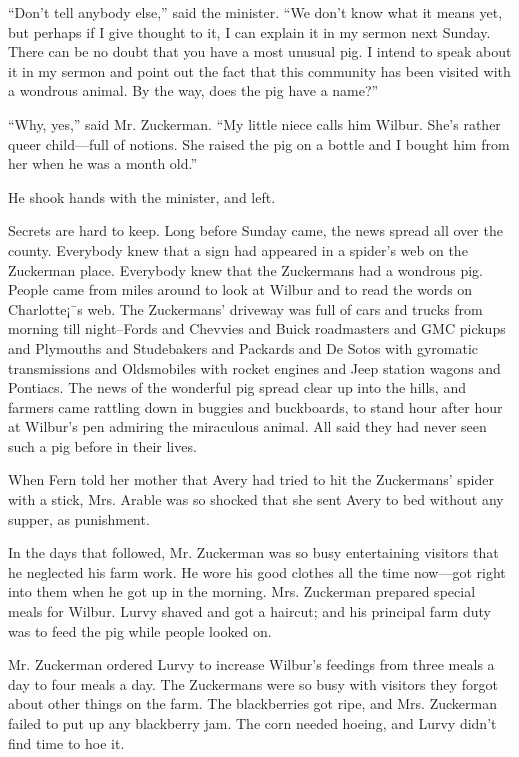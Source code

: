 \documentclass[a4paper, oneside]{book}
\begin{document}
``Don't tell anybody else,'' said the minister. ``We don't know
what it means yet, but perhaps if I give thought to it, I can explain
it in my sermon next Sunday. There can be no doubt that you have
a most unusual pig. I intend to speak about it in my sermon and
point out the fact that this community has been visited with a
wondrous animal. By the way, does the pig have a name?''

``Why, yes,'' said Mr. Zuckerman. ``My little niece calls him
Wilbur. She's rather queer child---full of notions. She raised the pig
on a bottle and I bought him from her when he was a month old.''

He shook hands with the minister, and left.

Secrets are hard to keep. Long before Sunday came, the news
spread all over the county. Everybody knew that a sign had
appeared in a spider's web on the Zuckerman place. Everybody
knew that the Zuckermans had a wondrous pig. People came from
miles around to look at Wilbur and to read the words on
Charlotte¡¯s web. The Zuckermans' driveway was full of cars and
trucks from morning till night--Fords and Chevvies and Buick
roadmasters and GMC pickups and Plymouths and Studebakers
and Packards and De Sotos with gyromatic transmissions and
Oldsmobiles with rocket engines and Jeep station wagons and
Pontiacs. The news of the wonderful pig spread clear up into the
hills, and farmers came rattling down in buggies and buckboards,
to stand hour after hour at Wilbur's pen admiring the miraculous
animal. All said they had never seen such a pig before in their lives.

When Fern told her mother that Avery had tried to hit the
Zuckermans' spider with a stick, Mrs. Arable was so shocked that
she sent Avery to bed without any supper, as punishment.

In the days that followed, Mr. Zuckerman was so busy
entertaining visitors that he neglected his farm work. He wore his
good clothes all the time now---got right into them when he got up
in the morning. Mrs. Zuckerman prepared special meals for Wilbur.
Lurvy shaved and got a haircut; and his principal farm duty was to
feed the pig while people looked on.

Mr. Zuckerman ordered Lurvy to increase Wilbur's feedings
from three meals a day to four meals a day. The Zuckermans were
so busy with visitors they forgot about other things on the farm.
The blackberries got ripe, and Mrs. Zuckerman failed to put up any
blackberry jam. The corn needed hoeing, and Lurvy didn't find
time to hoe it.
\end{document}
